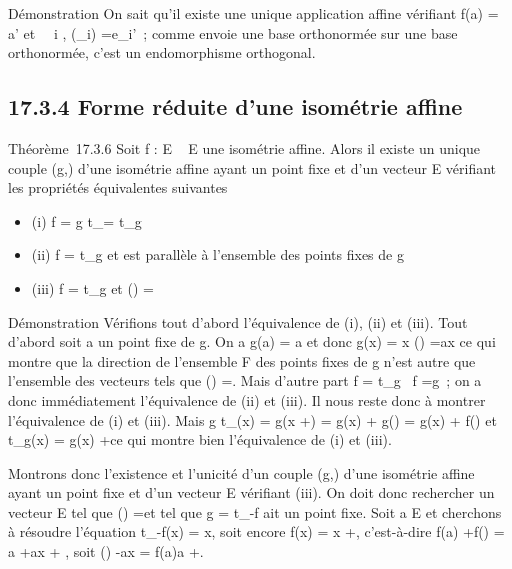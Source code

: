 \documentclass[]{article}
\begin{document}
Démonstration On sait qu'il existe une unique application affine
vérifiant f(a) = a' et \forall~~i \in [1,n],
\vecf(\vece_i)
=\vec e_i'~; comme \vecf
envoie une base orthonormée sur une base orthonormée, c'est un
endomorphisme orthogonal.

\subsection{17.3.4 Forme réduite d'une isométrie affine}

Théorème~17.3.6 Soit f : E \rightarrow~ E une isométrie affine. Alors il existe un
unique couple (g,\overrightarrow\xi) d'une isométrie
affine ayant un point fixe et d'un vecteur
\overrightarrow\xi \in\overrightarrow
E vérifiant les propriétés équivalentes suivantes

\begin{itemize}
\itemsep1pt\parskip0pt
\item
  (i) f = g \cdot t_\overrightarrow\xi =
  t_\overrightarrow\xi \cdot g
\item
  (ii) f = t_\overrightarrow\xi \cdot g et
  \overrightarrow\xi est parallèle à l'ensemble des
  points fixes de g
\item
  (iii) f = t_\overrightarrow\xi \cdot g et
  \vecf(\overrightarrow\xi)
  =\overrightarrow \xi
\end{itemize}

Démonstration Vérifions tout d'abord l'équivalence de (i), (ii) et
(iii). Tout d'abord soit a un point fixe de g. On a g(a) = a et donc
g(x) = x \Leftrightarrow
\vecg(\overrightarrowax)
=\overrightarrow ax ce qui montre que la direction
\overrightarrowF de l'ensemble F des points fixes de
g n'est autre que l'ensemble des vecteurs
\overrightarrow\xi tels que
\vecg(\overrightarrow\xi)
=\overrightarrow \xi. Mais d'autre part f =
t_\overrightarrow\xi \cdot g
\rigtharrow~\vec f =\vec g~; on a donc
immédiatement l'équivalence de (ii) et (iii). Il nous reste donc à
montrer l'équivalence de (i) et (iii). Mais g \cdot
t_\overrightarrow\xi(x) = g(x
+\overrightarrow \xi) = g(x) +\vec
g(\overrightarrow\xi) = g(x) +\vec
f(\overrightarrow\xi) et
t_\overrightarrow\xi \cdot g(x) = g(x)
+\overrightarrow \xi ce qui montre bien l'équivalence
de (i) et (iii).

Montrons donc l'existence et l'unicité d'un couple
(g,\overrightarrow\xi) d'une isométrie affine ayant un
point fixe et d'un vecteur \overrightarrow\xi
\in\overrightarrow E vérifiant (iii). On doit donc
rechercher un vecteur \overrightarrow\xi
\in\overrightarrow E tel que
\vecf(\overrightarrow\xi)
=\overrightarrow \xi et tel que g =
t_-\overrightarrow\xi \cdot f ait un point fixe.
Soit a \in E et cherchons à résoudre l'équation
t_-\overrightarrow\xi \cdot f(x) = x, soit encore
f(x) = x +\overrightarrow \xi, c'est-à-dire f(a)
+\vec f(\overrightarrowax) = a
+\overrightarrow ax +\overrightarrow
\xi, soit \vecf(\overrightarrowax)
-\overrightarrow ax =\overrightarrow
f(a)a +\overrightarrow \xi.
\end{document}
